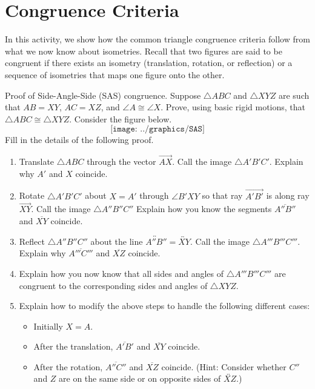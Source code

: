 \newpage

\section{Congruence Criteria}
In this activity, we show how the common triangle congruence criteria follow from
 what we now know about isometries.  Recall that two figures are said to be 
congruent if there exists an isometry (translation, rotation, or reflection) or a 
sequence of isometries that maps one figure onto the other.  


\begin{prob}
Proof of Side-Angle-Side (SAS) congruence.  Suppose $\triangle ABC$ and $\triangle XYZ$ are such that $AB=XY$, $AC=XZ$, and $\angle A \cong \angle X$.  Prove, using basic rigid motions, that $\triangle ABC \cong \triangle XYZ$.  Consider the figure below.  
$$\texttt{[image: ../graphics/SAS]}$$
Fill in the details of the following proof.  
\begin{enumerate}
\item Translate $\triangle ABC$ through the vector $\overrightarrow{AX}$.  Call the image $\triangle A'B'C'$.  Explain why $A'$ and $X$ coincide.
\item Rotate $\triangle A'B'C'$ about $X=A'$ through $\angle B'XY$ so that ray $\overrightarrow{A'B'}$ is along ray $\overrightarrow{XY}$.  Call the image $\triangle A''B''C''$   Explain how you know the segments $\overline{A''B''}$ and $\overline{XY}$ coincide. 
\item Reflect $\triangle A''B''C''$ about the line $\overleftrightarrow{A''B''} = \overleftrightarrow{XY}$.  Call the image $\triangle A'''B'''C'''$.  Explain why $\overline{A'''C'''}$ and $\overline{XZ}$ coincide.
\item Explain how you now know that all sides and angles of $\triangle A'''B'''C'''$ are congruent to the corresponding sides and angles of $\triangle XYZ$.  
\item Explain how to modify the above steps to handle the following different cases: 
\begin{itemize}
\item Initially $X = A$. 
\item After the translation, $\overline{A'B'}$ and $\overline{XY}$ coincide. 
\item After the rotation, $\overline{A''C''}$ and $\overline{XZ}$ coincide.  (Hint:  Consider whether $C''$ and $Z$ are on the same side or on opposite sides of $\overleftrightarrow{XZ}$.)  
\end{itemize}
\end{enumerate}
\end{prob}

